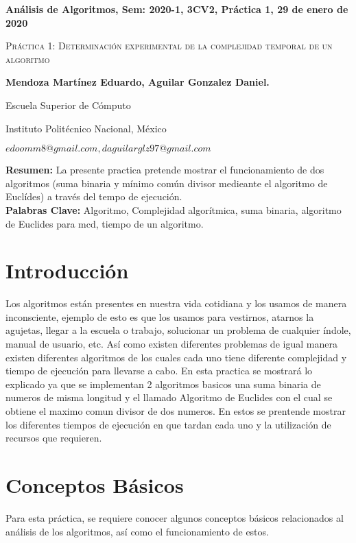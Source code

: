 \documentclass[12pt,twoside]{article}
\date{}
\begin{document}
\centerline{\bf An\'alisis de Algoritmos, Sem: 2020-1, 3CV2, Pr\'actica 1, 29 de enero de 2020}
\centerline{}
\centerline{}
\begin{center}
\Large{\textsc{Pr\'actica 1: Determinaci\'on experimental de la complejidad temporal de un
algoritmo}}
\end{center}
\centerline{}
\centerline{\bf {Mendoza Mart\'inez Eduardo, Aguilar Gonzalez Daniel.}}
\centerline{}
\centerline{Escuela Superior de C\'omputo}
\centerline{Instituto Polit\'ecnico Nacional, M\'exico}
\centerline{$edoomm8@gmail.com, daguilarglz97@gmail.com$}
\newtheorem{Theorem}{\quad Theorem}[section]
\newtheorem{Definition}[Theorem]{\quad Definition}
\newtheorem{Corollary}[Theorem]{\quad Corollary}
\newtheorem{Lemma}[Theorem]{\quad Lemma}
\newtheorem{Example}[Theorem]{\quad Example}
\bigskip
\textbf{Resumen:} La presente practica pretende mostrar el funcionamiento de dos algoritmos (suma binaria y mínimo común
divisor medieante el algoritmo de Euclídes) a través del tempo de ejecución.\\
{\bf Palabras Clave:} Algoritmo, Complejidad algorítmica, suma binaria, algoritmo de Euclides para mcd, tiempo de un algoritmo.
\section{Introducci\'on}
Los algoritmos están presentes en nuestra vida cotidiana y los usamos de manera inconsciente, ejemplo de esto 
es que los usamos para vestirnos, atarnos la agujetas, llegar a la escuela o trabajo, solucionar un problema
de cualquier \'indole, manual de usuario, etc.
As\'i como existen diferentes problemas de igual manera existen diferentes algoritmos de los cuales cada uno 
tiene diferente complejidad y tiempo de ejecución para llevarse a cabo. 
En esta practica se mostrará lo explicado ya que se implementan 2 algoritmos basicos una suma binaria de numeros 
de misma longitud y el llamado Algoritmo de Euclides con el cual se obtiene el maximo comun divisor de dos numeros. En
estos se prentende mostrar los diferentes tiempos de ejecuci\'on en que tardan cada uno y la utilizaci\'on de recursos
que requieren.
\section{Conceptos B\'asicos}
Para esta pr\'actica, se requiere conocer algunos conceptos básicos relacionados al análisis de los algoritmos, as\'i
como el funcionamiento de estos.
\end{document}
